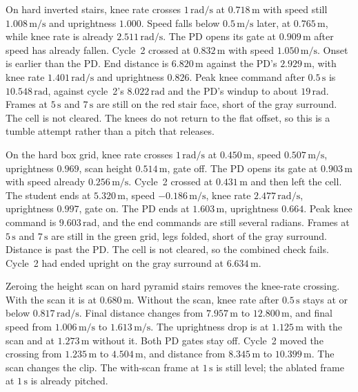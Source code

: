 \documentclass[11pt]{article}
\begin{document}
On hard inverted stairs, knee rate crosses \(1\,\mathrm{rad/s}\) at \(0.718\,\mathrm{m}\) with speed still \(1.008\,\mathrm{m/s}\) and uprightness \(1.000\).
Speed falls below \(0.5\,\mathrm{m/s}\) later, at \(0.765\,\mathrm{m}\), while knee rate is already \(2.511\,\mathrm{rad/s}\).
The PD opens its gate at \(0.909\,\mathrm{m}\) after speed has already fallen.
Cycle~2 crossed at \(0.832\,\mathrm{m}\) with speed \(1.050\,\mathrm{m/s}\).
Onset is earlier than the PD.
End distance is \(6.820\,\mathrm{m}\) against the PD's \(2.929\,\mathrm{m}\), with knee rate \(1.401\,\mathrm{rad/s}\) and uprightness \(0.826\).
Peak knee command after \(0.5\,\mathrm{s}\) is \(10.548\,\mathrm{rad}\), against cycle~2's \(8.022\,\mathrm{rad}\) and the PD's windup to about \(19\,\mathrm{rad}\).
Frames at \(5\,\mathrm{s}\) and \(7\,\mathrm{s}\) are still on the red stair face, short of the gray surround.
The cell is not cleared.
The knees do not return to the flat offset, so this is a tumble attempt rather than a pitch that releases.

On the hard box grid, knee rate crosses \(1\,\mathrm{rad/s}\) at \(0.450\,\mathrm{m}\), speed \(0.507\,\mathrm{m/s}\), uprightness \(0.969\), scan height \(0.514\,\mathrm{m}\), gate off.
The PD opens its gate at \(0.903\,\mathrm{m}\) with speed already \(0.256\,\mathrm{m/s}\).
Cycle~2 crossed at \(0.431\,\mathrm{m}\) and then left the cell.
The student ends at \(5.320\,\mathrm{m}\), speed \(-0.186\,\mathrm{m/s}\), knee rate \(2.477\,\mathrm{rad/s}\), uprightness \(0.997\), gate on.
The PD ends at \(1.603\,\mathrm{m}\), uprightness \(0.664\).
Peak knee command is \(9.603\,\mathrm{rad}\), and the end commands are still several radians.
Frames at \(5\,\mathrm{s}\) and \(7\,\mathrm{s}\) are still in the green grid, legs folded, short of the gray surround.
Distance is past the PD.
The cell is not cleared, so the combined check fails.
Cycle~2 had ended upright on the gray surround at \(6.634\,\mathrm{m}\).

Zeroing the height scan on hard pyramid stairs removes the knee-rate crossing.
With the scan it is at \(0.680\,\mathrm{m}\).
Without the scan, knee rate after \(0.5\,\mathrm{s}\) stays at or below \(0.817\,\mathrm{rad/s}\).
Final distance changes from \(7.957\,\mathrm{m}\) to \(12.800\,\mathrm{m}\), and final speed from \(1.006\,\mathrm{m/s}\) to \(1.613\,\mathrm{m/s}\).
The uprightness drop is at \(1.125\,\mathrm{m}\) with the scan and at \(1.273\,\mathrm{m}\) without it.
Both PD gates stay off.
Cycle~2 moved the crossing from \(1.235\,\mathrm{m}\) to \(4.504\,\mathrm{m}\), and distance from \(8.345\,\mathrm{m}\) to \(10.399\,\mathrm{m}\).
The scan changes the clip.
The with-scan frame at \(1\,\mathrm{s}\) is still level; the ablated frame at \(1\,\mathrm{s}\) is already pitched.
\end{document}
